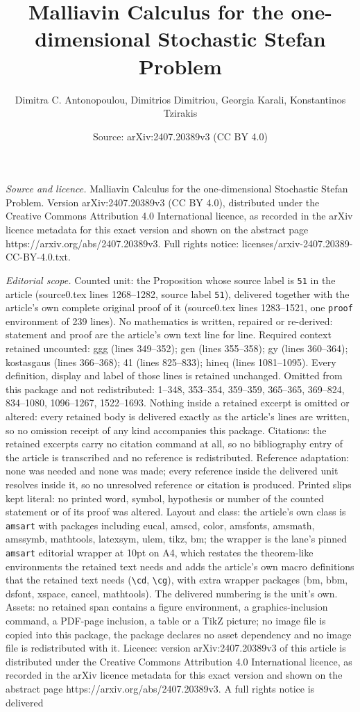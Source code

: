 \documentclass[10pt,a4paper]{amsart}
\title[Malliavin Calculus for the one-dimensional Stochastic Stefan]{Malliavin Calculus for the one-dimensional Stochastic Stefan Problem}
\author{Dimitra C. Antonopoulou, Dimitrios Dimitriou, Georgia Karali, Konstantinos Tzirakis}
\date{Source: arXiv:2407.20389v3 (CC BY 4.0)}
\begin{document}
\maketitle

\noindent\emph{Source and licence.} Malliavin Calculus for the one-dimensional Stochastic Stefan Problem. Version arXiv:2407.20389v3 (CC BY 4.0), distributed under the Creative Commons Attribution 4.0 International licence, as recorded in the arXiv licence metadata for this exact version and shown on the abstract page https://arxiv.org/abs/2407.20389v3. Full rights notice: licenses/arxiv-2407.20389-CC-BY-4.0.txt.\par\smallskip

\noindent\textit{Editorial scope.} Counted unit: the Proposition whose source label is \texttt{51} in the article (source0.tex lines 1268--1282, source label \texttt{51}), delivered together with the article's own complete original proof of it (source0.tex lines 1283--1521, one \texttt{proof} environment of 239 lines). No mathematics is written, repaired or re-derived: statement and proof are the article's own text line for line. Required context retained uncounted: ggg (lines 349--352); gen (lines 355--358); gy (lines 360--364); kostasgaus (lines 366--368); 41 (lines 825--833); hineq (lines 1081--1095). Every definition, display and label of those lines is retained unchanged. Omitted from this package and not redistributed: 1--348, 353--354, 359--359, 365--365, 369--824, 834--1080, 1096--1267, 1522--1693. Nothing inside a retained excerpt is omitted or altered: every retained body is delivered exactly as the article's lines are written, so no omission receipt of any kind accompanies this package. Citations: the retained excerpts carry no citation command at all, so no bibliography entry of the article is transcribed and no reference is redistributed. Reference adaptation: none was needed and none was made; every reference inside the delivered unit resolves inside it, so no unresolved reference or citation is produced. Printed slips kept literal: no printed word, symbol, hypothesis or number of the counted statement or of its proof was altered. Layout and class: the article's own class is \texttt{amsart} with packages including eucal, amscd, color, amsfonts, amsmath, amssymb, mathtools, latexsym, ulem, tikz, bm; the wrapper is the lane's pinned \texttt{amsart} editorial wrapper at 10pt on A4, which restates the theorem-like environments the retained text needs and adds the article's own macro definitions that the retained text needs (\texttt{\textbackslash cd}, \texttt{\textbackslash cg}), with extra wrapper packages (bm, bbm, dsfont, xspace, cancel, mathtools). The delivered numbering is the unit's own. Assets: no retained span contains a figure environment, a graphics-inclusion command, a PDF-page inclusion, a table or a TikZ picture; no image file is copied into this package, the package declares no asset dependency and no image file is redistributed with it. Licence: version arXiv:2407.20389v3 of this article is distributed under the Creative Commons Attribution 4.0 International licence, as recorded in the arXiv licence metadata for this exact version and shown on the abstract page https://arxiv.org/abs/2407.20389v3. A full rights notice is delivered 
\end{document}
